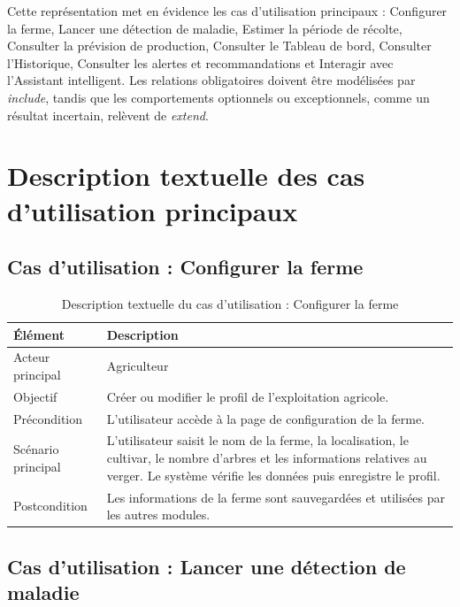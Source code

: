 \documentclass[12pt,a4paper]{report}
\begin{document}
Cette représentation met en évidence les cas d'utilisation principaux : Configurer la ferme, Lancer une détection de maladie, Estimer la période de récolte, Consulter la prévision de production, Consulter le Tableau de bord, Consulter l'Historique, Consulter les alertes et recommandations et Interagir avec l'Assistant intelligent. Les relations obligatoires doivent être modélisées par \textit{include}, tandis que les comportements optionnels ou exceptionnels, comme un résultat incertain, relèvent de \textit{extend}.

\section{Description textuelle des cas d'utilisation principaux}

\subsection{Cas d'utilisation : Configurer la ferme}

\begin{table}[H]
\centering
\caption{Description textuelle du cas d'utilisation : Configurer la ferme}
\label{tab:cu-configurer-ferme}
\begin{tabular}{|p{4cm}|p{10cm}|}
\hline
\textbf{Élément} & \textbf{Description} \\
\hline
Acteur principal & Agriculteur \\
\hline
Objectif & Créer ou modifier le profil de l'exploitation agricole. \\
\hline
Précondition & L'utilisateur accède à la page de configuration de la ferme. \\
\hline
Scénario principal & L'utilisateur saisit le nom de la ferme, la localisation, le cultivar, le nombre d'arbres et les informations relatives au verger. Le système vérifie les données puis enregistre le profil. \\
\hline
Postcondition & Les informations de la ferme sont sauvegardées et utilisées par les autres modules. \\
\hline
\end{tabular}
\end{table}

\subsection{Cas d'utilisation : Lancer une détection de maladie}
\end{document}
